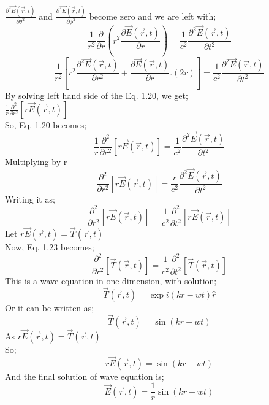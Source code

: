 $\frac{\partial^2\vec{E}(\vec{r},t)}{\partial \theta^2}$ and $\frac{\partial^2\vec{E}(\vec{r},t)}{\partial \phi^2}$ become zero and we are left with;\\
\begin{equation}
\frac{1}{r^2}\frac{\partial}{\partial r}(r^2\frac{\partial\vec{E}(\vec{r},t) }{\partial r}) = \frac{1}{c^2}\frac{\partial^2\vec{E}(\vec{r},t)}{\partial t^2}
\end{equation}
\begin{equation}
\frac{1}{r^2}[r^2\frac{\partial^2\vec{E}(\vec{r},t)}{\partial r^2}+\frac{\partial\vec{E}(\vec{r},t) }{\partial r}.(2r)] = \frac{1}{c^2}\frac{\partial^2\vec{E}(\vec{r},t)}{\partial t^2}
\end{equation}
By solving left hand side of the Eq. 1.20, we get;\\
 $\frac{1}{r}\frac{\partial^2}{\partial r^2}[r\vec{E}(\vec{r},t)]$\\
So, Eq. 1.20 becomes;\\
\begin{equation}
\frac{1}{r}\frac{\partial^2}{\partial r^2}[r\vec{E}(\vec{r},t)] = \frac{1}{c^2}\frac{\partial^2\vec{E}(\vec{r},t)}{\partial t^2} 
\end{equation}
Multiplying by r\\
\begin{equation}
\frac{\partial^2}{\partial r^2}[r\vec{E}(\vec{r},t)] = \frac{r}{c^2}\frac{\partial^2\vec{E}(\vec{r},t)}{\partial t^2} 
\end{equation}
Writing it as;\\
\begin{equation}
\frac{\partial^2}{\partial r^2}[r\vec{E}(\vec{r},t)] = \frac{1}{c^2}\frac{\partial^2}{\partial t^2}[r\vec{E}(\vec{r},t)]
\end{equation}
Let $r\vec{E}(\vec{r},t) = \vec{T}(\vec{r},t)$\\
Now, Eq. 1.23 becomes;\\
\begin{equation}
\frac{\partial^2}{\partial r^2}[\vec{T}(\vec{r},t)] = \frac{1}{c^2}\frac{\partial^2}{\partial t^2}[\vec{T}(\vec{r},t)]
\end{equation}
This is a wave equation in one dimension, with solution;\\
\begin{equation}
\vec{T}(\vec{r},t) = \exp{i(kr-wt)}\hat{r}
\end{equation}
Or it can be written as;\\
\begin{equation}
\vec{T}(\vec{r},t) = \sin(kr-wt)
\end{equation}
As $r\vec{E}(\vec{r},t) = \vec{T}(\vec{r},t)$\\
So;\\
\begin{equation}
r\vec{E}(\vec{r},t) = \sin(kr-wt)
\end{equation}
And the final solution of wave equation is;\\
\begin{equation}
\vec{E}(\vec{r},t) = \frac{1}{r}\sin(kr-wt)
\end{equation}


